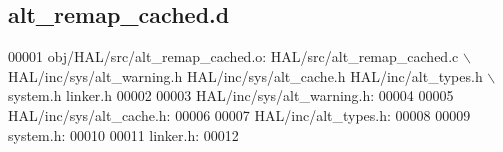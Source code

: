 \subsection{alt\+\_\+remap\+\_\+cached.\+d}
\label{alt__remap__cached_8d_source}

\begin{DoxyCode}
00001 obj/HAL/src/alt_remap_cached.o: HAL/src/alt_remap_cached.c \(\backslash\)
 HAL/inc/sys/alt\_warning.h HAL/inc/sys/alt\_cache.h HAL/inc/alt\_types.h \(\backslash\)
 system.h linker.h
00002 
00003 HAL/inc/sys/alt\_warning.h:
00004 
00005 HAL/inc/sys/alt\_cache.h:
00006 
00007 HAL/inc/alt\_types.h:
00008 
00009 system.h:
00010 
00011 linker.h:
00012 \end{DoxyCode}
